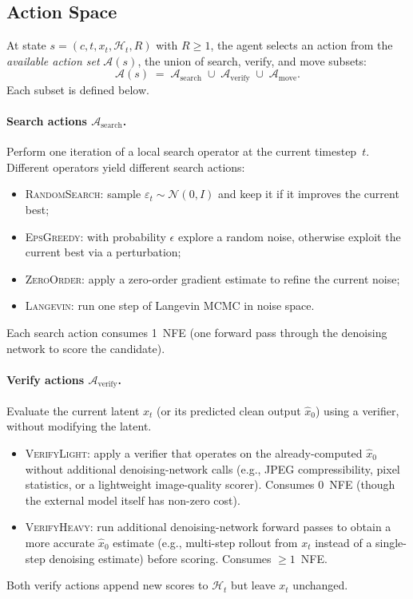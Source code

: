 \subsection{Action Space}

At state $s = (c, t, x_t, \mathcal{H}_t, R)$ with $R \ge 1$, the agent
selects an action from the \emph{available action set} $\mathcal{A}(s)$,
the union of search, verify, and move subsets:
\[
  \mathcal{A}(s) \;=\; \mathcal{A}_{\text{search}} \;\cup\;
  \mathcal{A}_{\text{verify}} \;\cup\; \mathcal{A}_{\text{move}}.
\]
Each subset is defined below.

\paragraph{Search actions $\mathcal{A}_{\text{search}}$.}
Perform one iteration of a local search operator at the current
timestep~$t$.  Different operators yield different search actions:
\begin{itemize}
  \item \textsc{RandomSearch}: sample $\varepsilon_t \sim \mathcal{N}(0,I)$
    and keep it if it improves the current best;
  \item \textsc{EpsGreedy}: with probability $\epsilon$ explore a random
    noise, otherwise exploit the current best via a perturbation;
  \item \textsc{ZeroOrder}: apply a zero-order gradient estimate to refine
    the current noise;
  \item \textsc{Langevin}: run one step of Langevin MCMC in noise space.
\end{itemize}
Each search action consumes 1~NFE (one forward pass through the
denoising network to score the candidate).

\paragraph{Verify actions $\mathcal{A}_{\text{verify}}$.}
Evaluate the current latent $x_t$ (or its predicted clean output
$\hat{x}_0$) using a verifier, without modifying the latent.
\begin{itemize}
  \item \textsc{VerifyLight}: apply a verifier that operates on the
    already-computed $\hat{x}_0$ without additional denoising-network
    calls (e.g., JPEG compressibility, pixel statistics, or a
    lightweight image-quality scorer).  Consumes 0~NFE (though the external
    model itself has non-zero cost).
  \item \textsc{VerifyHeavy}: run additional denoising-network
    forward passes to obtain a more accurate $\hat{x}_0$ estimate
    (e.g., multi-step rollout from $x_t$ instead of a single-step
    denoising estimate) before scoring.  Consumes $\ge 1$~NFE.
\end{itemize}
Both verify actions append new scores to $\mathcal{H}_t$
but leave $x_t$ unchanged.

